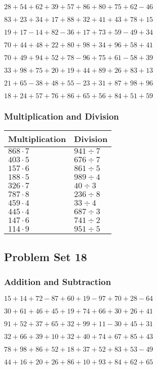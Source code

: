 \(28+54+62+39+57+86+80+75+62-46\)

\(83+23+34+17+88+32+41+43+78+15\)

\(19+17-14+82-36+17+73+59-49+34\)

\(70+44+48+22+80+98+34+96+58+41\)

\(70+49+94+52+78-96+75+61-58+39\)

\(33+98+75+20+19+44+89+26+83+13\)

\(21+65-38+48+55-23+31+87+98+96\)

\(18+24+57+76+86+65+56+84+51+59\)

\hypertarget{multiplication-and-division-16}{%
\subsubsection{Multiplication and
Division}\label{multiplication-and-division-16}}

\begin{longtable}[]{@{}ll@{}}
\toprule
Multiplication & Division\tabularnewline
\midrule
\endhead
\(868\cdot7\) & \(941÷7\)\tabularnewline
\(403\cdot5\) & \(676÷7\)\tabularnewline
\(157\cdot6\) & \(861÷5\)\tabularnewline
\(188\cdot5\) & \(989÷4\)\tabularnewline
\(326\cdot7\) & \(40÷3\)\tabularnewline
\(787\cdot8\) & \(236÷8\)\tabularnewline
\(459\cdot4\) & \(33÷4\)\tabularnewline
\(445\cdot4\) & \(687÷3\)\tabularnewline
\(147\cdot6\) & \(741÷2\)\tabularnewline
\(114\cdot9\) & \(951÷5\)\tabularnewline
\bottomrule
\end{longtable}

\hypertarget{problem-set-18}{%
\subsection{Problem Set 18}\label{problem-set-18}}

\hypertarget{addition-and-subtraction-17}{%
\subsubsection{Addition and
Subtraction}\label{addition-and-subtraction-17}}

\(15+14+72-87+60+19-97+70+28-64\)

\(30+61+46+45+19+74+66+30+26+41\)

\(91+52+37+65+32+99+11-30+45+31\)

\(32+66+39+10+32+40+74+67+85+43\)

\(78+98+86+52+18+37+52+83+53-49\)

\(44+16+20+26+86+10+93+84+62+65\)

